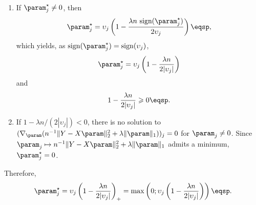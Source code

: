 \begin{enumerate}[-]
\item If $\param_j^{\star} \neq 0$, then
\[
\param_j^{\star} = \upsilon_j\left( 1 - \frac{\lambda n~\textrm{sign}(\param_j^{\star})}{2 \upsilon_j}\right)\eqsp,
\]
which yields, as  $\textrm{sign}(\param_j^{\star}) = \textrm{sign}(\upsilon_j)$,
\[
\param_j^{\star} = \upsilon_j\left(1 - \frac{\lambda n }{2 |\upsilon_j|}\right)
\]
and
\[
1 - \frac{\lambda n }{2 |\upsilon_j|} \geqslant 0\eqsp.
\]
\item If $1 - \lambda n/(2 |\upsilon_j|)<0$, there is no solution to $(\nabla_\param ( n^{-1}\|Y - X\param\|_2^2 +  \lambda\|\param\|_1))_j=0$ for $\param_j \neq 0$.  Since $\param_j \mapsto  n^{-1}\|Y - X\param\|_2^2 + \lambda\|\param\|_1$ admits a minimum, $\param_j^{\star}=0$. 
\end{enumerate}
Therefore,
\[
\param_j^{\star} = \upsilon_j\left( 1 - \frac{\lambda n}{2 |\upsilon_j|}\right)_+ = \mathrm{max}\left(0;\upsilon_j\left( 1 - \frac{\lambda n}{2 |\upsilon_j|}\right)\right)\eqsp.
\]

